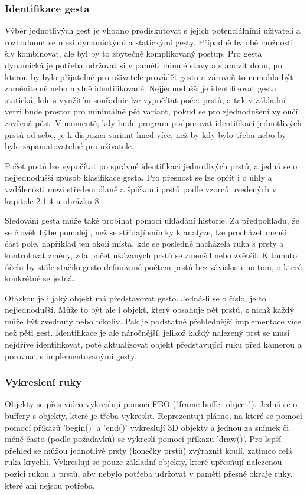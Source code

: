 \subsubsection{Identifikace gesta}
Výběr jednotlivých gest je vhodno prodiskutovat s jejich potenciálními uživateli a rozhodnout se mezi dynamickými a statickými gesty. Případně by obě možnosti šly kombinovat, ale byl by to zbytečně komplikovaný postup. Pro gesta dynamická je potřeba udržovat si v paměti minulé stavy a stanovit dobu, po kterou by bylo přijatelné pro uživatele provádět gesto a zároveň to nemohlo být zaměnitelné nebo mylně identifikované. Nejjednodušší je identifikovat gesta statická, kde s využitím souřadnic lze vypočítat počet prstů, a tak v základní verzi bude prostor pro minimálně pět variant, pokud se pro zjednodušení vyloučí zavřená pěst. V momentě, kdy bude program podporovat identifikaci jednotlivých prstů od sebe, je k dispozici variant hned více, než by kdy bylo třeba nebo by bylo zapamatovatelné pro uživatele.

Počet prstů lze vypočítat po správné identifikaci jednotlivých prstů, a jedná se o nejjednodušší způsob klasifikace gesta. Pro přesnost se lze opřít i o úhly a vzdálenosti mezi středem dlaně a špičkami prstů podle vzorců uvedených v kapitole 2.1.4 u obrázku 8.

Sledování gesta může také probíhat pomocí ukládání historie. Za předpokladu, že se člověk hýbe pomaleji, než se střídají snímky k analýze, lze procházet menší část pole, například jen okolí místa, kde se posledně nacházela ruka s prsty a kontrolovat změny, zda počet ukázaných prstů se zmenšil nebo zvětšil. K tomuto účelu by stále stačilo gesto definované počtem prstů bez závislosti na tom, o které konkrétně se jedná.

Otázkou je i jaký objekt má představovat gesto. Jedná-li se o číslo, je to nejjednodušší. Může to být ale i objekt, který obsahuje pět prstů, z nichž každý může být zvednutý nebo nikoliv. Pak je podstatně přehlednější implementace více než pěti gest. Identifikace je ale náročnější, jelikož každý nalezený prst se musí nejdříve identifikovat, poté aktualizovat objekt představující ruku před kamerou a porovnat s implementovanými gesty. 

\subsubsection{Vykreslení ruky}
Objekty se přes video vykreslují pomocí FBO ("frame buffer object"). Jedná se o buffery s objekty, které je třeba vykreslit. Reprezentují plátno, na které se pomocí pomocí příkazů 'begin()' a 'end()' vykreslují 3D objekty a jednou za snímek či méně často (podle požadavků) se vykreslí pomocí příkazu 'draw()'. Pro lepší přehled se můžou jednotlivé prsty (konečky prstů) zvýraznit koulí, zatímco celá ruka krychlí. Vykreslují se pouze základní objekty, které upřesňují nalezenou pozici rukou a prstů, aby nebylo potřeba udržovat v paměti přesné okraje ruky, které ani nejsou potřeba.

